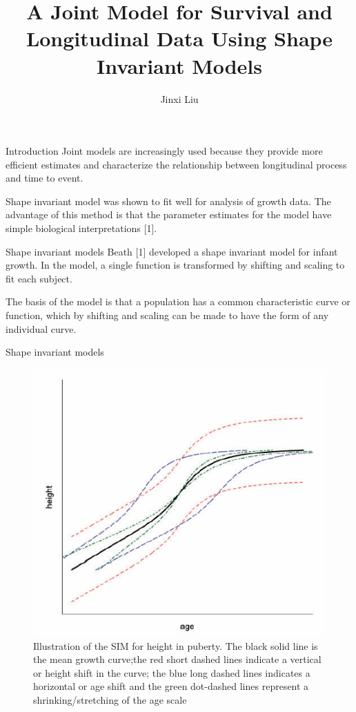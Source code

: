 \documentclass{beamer}
\title{A Joint Model for Survival and Longitudinal Data Using Shape Invariant Models}
\author{Jinxi Liu}
\begin{document}
	
\begin{frame}
	
	\titlepage
	
\end{frame}


\begin{frame}[t]{Introduction}\vspace{10pt}
Joint models are increasingly used because they provide more efficient estimates and characterize the relationship between longitudinal process and time to event.

Shape invariant model was shown to fit well for analysis of growth data. The advantage of this method is that the parameter estimates for the model have  simple biological interpretations [1].

\end{frame}

\begin{frame}[t]{Shape invariant models}\vspace{10pt}
Beath [1] developed a shape invariant model for infant growth. In the model, a single function is transformed by shifting and scaling to fit each subject.

The basis of the model is that a population has a common characteristic curve or function, which by shifting and scaling can be made to have the form of any individual curve.
\end{frame}

\begin{frame}[t]{Shape invariant models}\vspace{10pt}
\begin{figure}[h!]
	\includegraphics[scale=0.5]{sim.png}
	\caption{Illustration of the SIM for height in puberty. The black solid line is the mean growth curve;the red short dashed lines indicate a vertical or height shift in the curve; the blue long dashed lines indicates a horizontal or age shift and the green dot-dashed lines represent a shrinking/stretching of the age scale}
	\label{fig:sim}
\end{figure}
\end{frame}
\end{document}
